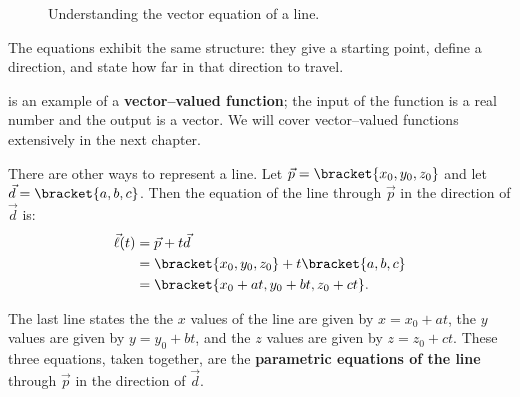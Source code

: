 \begin{figure}[!hb]
\centering
{}
\captionsetup{type=figure}%
\caption{Understanding the vector equation of a line.}
\label{fig:lines_eq}
\end{figure}

The equations exhibit the same structure: they give a starting point, define a direction, and state how far in that direction to travel.

 is an example of a \textbf{vector--valued function}; the input of the function is a real number and the output is a vector. We will cover vector--valued functions extensively in the next chapter.

There are other ways to represent a line. Let $\vec p =\bracket{x_0,y_0,z_0}$ and let $\vec d =\bracket{a,b,c}$. Then the equation of the line through $\vec p$ in the direction of $\vec d$ is:
\begin{align*}
\vec\ell(t) &= \vec p + t\vec d \\
						&=\bracket{x_0,y_0,z_0}+ t\bracket{a,b,c}\\
						&=\bracket{x_0 + at, y_0+bt, z_0+ct}.
\end{align*}

The last line states the the $x$ values of the line are given by $x=x_0+at$, the $y$ values are given by $y = y_0+bt$, and the $z$ values are given by $z = z_0 + ct$. These three equations, taken together, are the \textbf{parametric equations of the line} through $\vec p$ in the direction of $\vec d$.

